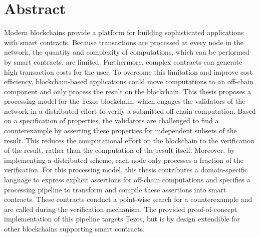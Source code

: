 \chapter*{Abstract}
Modern blockchains provide a platform for building sophisticated applications with smart contracts. Because transactions are processed at every node in the network, the quantity and complexity of computations, which can be performed by smart contracts, are limited. Furthermore, complex contracts can generate high transaction costs for the user. To overcome this limitation and improve cost efficiency, blockchain-based applications could move computations to an off-chain component and only process the result on the blockchain. This thesis proposes a processing model for the Tezos blockchain, which engages the validators of the network in a distributed effort to verify a submitted off-chain computation. Based on a specification of properties, the validators are challenged to find a counterexample by asserting these properties for independent subsets of the result. This reduces the computational effort on the blockchain to the verification of the result, rather than the computation of the result itself. Moreover, by implementing a distributed scheme, each node only processes a fraction of the verification. For this processing model, this thesis contributes a domain-specific language to express explicit assertions for off-chain computations and specifies a processing pipeline to transform and compile these assertions into smart contracts. These contracts conduct a point-wise search for a counterexample and are called during the verification mechanism. The provided proof-of-concept implementation of this pipeline targets Tezos, but is by design extendible for other blockchains supporting smart contracts.